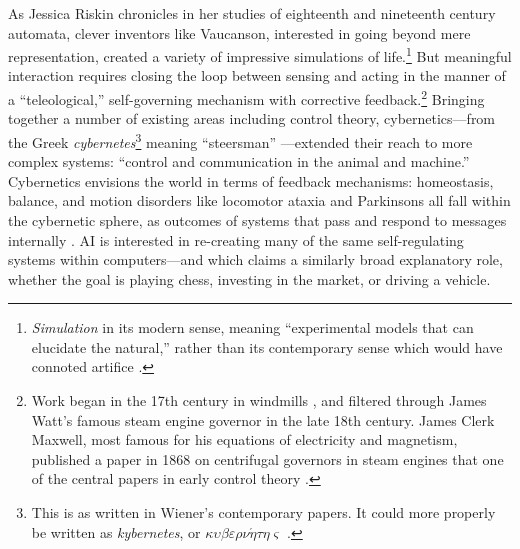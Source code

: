 As Jessica Riskin chronicles in her studies of eighteenth and
nineteenth century automata, clever inventors like Vaucanson, interested in going
beyond mere representation, created a variety of impressive
simulations of life.\footnote{\emph{Simulation} in its modern sense, meaning
``experimental models that can elucidate the natural,'' rather than its
contemporary sense which would have connoted artifice \cite[p.
  605--606]{riskinDuck}.} But meaningful interaction requires closing the loop between
sensing and acting in the manner of a
 ``teleological,'' self-governing mechanism with corrective
feedback.\footnote{Work began in the 17th century in windmills \cite{richardhills},
and filtered through James Watt's famous steam engine governor in the
late 18th century. James Clerk Maxwell, most famous for his equations of
 electricity and magnetism, published a paper in 1868 on centrifugal
 governors in steam engines that one of the central papers in early
 control theory \cite{ottomayr}.} Bringing together a number of existing
 areas including control theory,
 cybernetics---from the Greek \emph{cybernetes}\footnote{This is as
   written in Wiener's contemporary papers. It could more properly be written
   as \emph{kybernetes}, or 
   $\kappa\upsilon\beta\varepsilon\rho\nu\acute{\eta}\tau\eta\varsigma$
   \cite[p. 11]{cybernetics}.} meaning 
 ``steersman'' \cite[p. 6]{wienerMainIdeas}---extended their reach to more complex
 systems: ``control and communication in the animal and machine.''
 Cybernetics envisions the world in 
 terms of feedback mechanisms: homeostasis, balance, and motion
 disorders like locomotor ataxia and Parkinsons all fall within the
 cybernetic sphere, as outcomes of systems that pass and respond to
 messages internally \cite[p. 10-15]{wienerMainIdeas}. 
 AI is interested in re-creating many of the same
 self-regulating systems within computers---and which claims a
 similarly broad explanatory role, whether the goal is playing chess,
 investing in the market, or driving a vehicle. 





